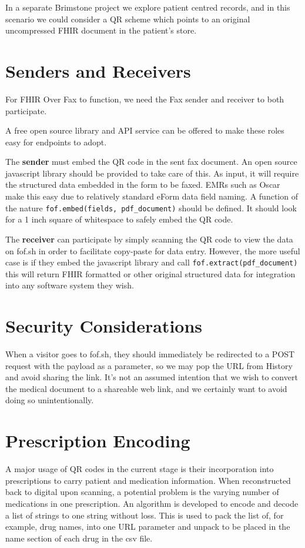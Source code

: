 \documentclass[12pt,a4paper]{article}
\begin{document}
In a separate Brimstone project we explore patient centred records, and in this scenario we could consider a QR scheme which points to an original uncompressed FHIR document in the patient’s store.


\section{Senders and Receivers}
For FHIR Over Fax to function, we need the Fax sender and receiver to both participate.

A free open source library and API service can be offered to make these roles easy for endpoints to adopt.

The \textbf{sender} must embed the QR code in the sent fax document. An open source javascript library should be provided to take care of this. As input, it will require the structured data embedded in the form to be faxed. EMRs such as Oscar make this easy due to relatively standard eForm data field naming. A function of the nature \verb+fof.embed(fields, pdf_document)+ should be defined. It should look for a 1 inch square of whitespace to safely embed the QR code.

The \textbf{receiver} can participate by simply scanning the QR code to view the data on fof.sh in order to facilitate copy-paste for data entry. However, the more useful case is if they embed the javascript library and call \verb+fof.extract(pdf_document)+ this will return FHIR formatted or other original structured data for integration into any software system they wish. 


\section{Security Considerations}
When a visitor goes to fof.sh, they should immediately be redirected to a POST request with the payload as a parameter, so we may pop the URL from History and avoid sharing the link. It’s not an assumed intention that we wish to convert the medical document to a shareable web link, and we certainly want to avoid doing so unintentionally.


\section{Prescription Encoding}
A major usage of QR codes in the current stage is their incorporation into prescriptions to carry patient and medication information. When reconstructed back to digital upon scanning, a potential problem is the varying number of medications in one prescription. An algorithm is developed to encode and decode a list of strings to one string without loss. This is used to pack the list of, for example, drug names, into one URL parameter and unpack to be placed in the name section of each drug in the csv file.
\end{document}
